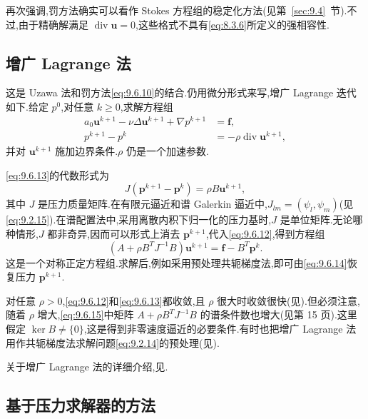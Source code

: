 再次强调,罚方法确实可以看作 Stokes 方程组的稳定化方法(见第~\ref{sec:9.4}~节).不过,由于精确解满足 \(\operatorname{div}\boldsymbol{u}=0\),这些格式不具有\eqref{eq:8.3.6}所定义的强相容性.

\subsection{增广 Lagrange 法}\label{sec:9.6.5}

这是 Uzawa 法和罚方法\eqref{eq:9.6.10}的结合.仍用微分形式来写,增广 Lagrange 迭代如下.给定 \(p^0\),对任意 \(k\ge0\),求解方程组
\begin{align}
  a_0\boldsymbol{u}^{k+1}-\nu\Delta\boldsymbol{u}^{k+1}+\nabla p^{k+1}
     &=\boldsymbol{f},\label{eq:9.6.12}\\
  p^{k+1}-p^k&=-\rho\operatorname{div}\boldsymbol{u}^{k+1},\label{eq:9.6.13}
\end{align}
并对 \(\boldsymbol{u}^{k+1}\) 施加边界条件.\(\rho\) 仍是一个加速参数.

\eqref{eq:9.6.13}的代数形式为
\begin{equation}\label{eq:9.6.14}
  J(\boldsymbol{p}^{k+1}-\boldsymbol{p}^k)=\rho B\boldsymbol{u}^{k+1},
\end{equation}
其中 \(J\) 是压力质量矩阵.在有限元逼近和谱 Galerkin 逼近中,\(J_{lm}=(\psi_l,\psi_m)\)(见\eqref{eq:9.2.15}).在谱配置法中,采用离散内积下归一化的压力基时,\(J\) 是单位矩阵.无论哪种情形,\(J\) 都非奇异,因而可以形式上消去 \(\boldsymbol{p}^{k+1}\),代入\eqref{eq:9.6.12},得到方程组
\begin{equation}\label{eq:9.6.15}
  (A+\rho B^TJ^{-1}B)\boldsymbol{u}^{k+1}=\boldsymbol{f}-B^T\boldsymbol{p}^k.
\end{equation}
这是一个对称正定方程组.求解后,例如采用预处理共轭梯度法,即可由\eqref{eq:9.6.14}恢复压力 \(\boldsymbol{p}^{k+1}\).

对任意 \(\rho>0\),\eqref{eq:9.6.12}和\eqref{eq:9.6.13}都收敛,且 \(\rho\) 很大时收敛很快(见).但必须注意,随着 \(\rho\) 增大,\eqref{eq:9.6.15}中矩阵 \(A+\rho B^TJ^{-1}B\) 的谱条件数也增大(见第 15 页).这里假定 \(\ker B\ne\{0\}\),这是得到非零速度逼近的必要条件.有时也把增广 Lagrange 法用作共轭梯度法求解问题\eqref{eq:9.2.14}的预处理(见).

关于增广 Lagrange 法的详细介绍,见.

\subsection{基于压力求解器的方法}\label{sec:9.6.6}

